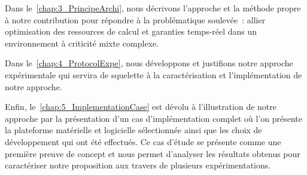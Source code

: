 \documentclass[french, a4paper, 11pt, twoside, pdftex]{StyleThese}
\begin{document}
Dans le~\autoref{chap:3_PrincipeArchi}, nous décrivons l'approche et la méthode propre à notre contribution pour répondre à la problématique soulevée~: allier optimisation des ressources de calcul et garanties temps-réel dans un environnement à criticité mixte complexe.

Dans le~\autoref{chap:4_ProtocolExpe}, nous développons et justifions notre approche expérimentale qui servira de squelette à la caractérisation et l'implémentation de notre approche.

Enfin, le~\autoref{chap:5_ImplementationCase} est dévolu à l’illustration de notre approche par la présentation d'un cas d'implémentation complet où l'on présente la plateforme matérielle et logicielle sélectionnée ainsi que les choix de développement qui ont été effectués. Ce cas d'étude se présente comme une première preuve de concept et nous permet d'analyser les résultats obtenus pour caractériser notre proposition aux travers de plusieurs expérimentations. 
\end{document}
